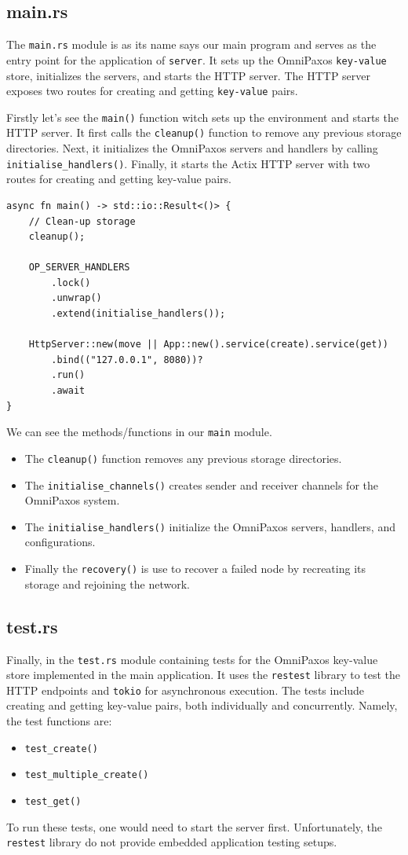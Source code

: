 \documentclass[a4paper, 11pt]{article}
\begin{document}
\subsection{main.rs}
The \verb|main.rs| module is as its name says our main program and serves as the entry point for the application of \verb|server|. It sets up the OmniPaxos \verb|key-value| store, initializes the servers, and starts the HTTP server. The HTTP server exposes two routes for creating and getting \verb|key-value| pairs.\par
Firstly let's see the \verb|main()| function witch sets up the environment and starts the HTTP server. It first calls the \verb|cleanup()| function to remove any previous storage directories. Next, it initializes the OmniPaxos servers and handlers by calling \verb|initialise_handlers()|. Finally, it starts the Actix HTTP server with two routes for creating and getting key-value pairs.
\begin{verbatim}
async fn main() -> std::io::Result<()> {
    // Clean-up storage
    cleanup();

    OP_SERVER_HANDLERS
        .lock()
        .unwrap()
        .extend(initialise_handlers());

    HttpServer::new(move || App::new().service(create).service(get))
        .bind(("127.0.0.1", 8080))?
        .run()
        .await
}
\end{verbatim}
We can see the methods/functions in our \verb|main| module.
\begin{itemize}
    \item The \verb|cleanup()| function removes any previous storage directories.
    \item The \verb|initialise_channels()| creates sender and receiver channels for the OmniPaxos system.
    \item The \verb|initialise_handlers()| initialize the OmniPaxos servers, handlers, and configurations.
    \item Finally the \verb|recovery()| is use to recover a failed node by recreating its storage and rejoining the network.
\end{itemize}

\subsection{test.rs}
Finally, in the \verb|test.rs| module containing tests for the OmniPaxos key-value store implemented in the main application. It uses the \verb|restest| library to test the HTTP endpoints and \verb|tokio| for asynchronous execution. The tests include creating and getting key-value pairs, both individually and concurrently.
Namely, the test functions are:
\begin{itemize}
    \item \verb|test_create()|
    \item \verb|test_multiple_create()|
    \item \verb|test_get()|
\end{itemize}
\par
To run these tests, one would need to start the server first. Unfortunately, the \verb|restest| library do not provide embedded application testing setups.
\end{document}
